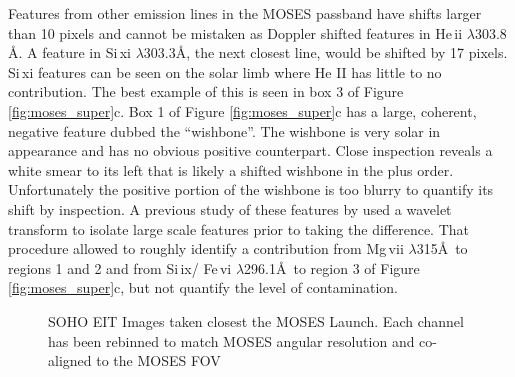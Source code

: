 \documentclass[]{solarphysics}
\begin{document}
\begin{article}
	
	Features from other emission lines in the MOSES passband have shifts larger than 10 pixels and cannot be mistaken as Doppler shifted features in He\,{\sc ii}  $\lambda303.8$ \AA. A feature in Si\,{\sc xi} $\lambda$303.3\AA , the next closest line, would be shifted by 17 pixels. Si\,{\sc xi} features can be seen on the solar limb where He II has little to no contribution. The best example of this is seen in box 3 of Figure \ref{fig:moses_super}c.  Box 1 of Figure \ref{fig:moses_super}c has a large, coherent, negative feature dubbed the ``wishbone''.  The wishbone is very solar in appearance and has no obvious positive counterpart.  Close inspection reveals a white smear to its left that is likely a shifted wishbone in the plus order.  Unfortunately the positive portion of the wishbone is too blurry to quantify its shift by inspection. A previous study of these features by \citet{Rust2017} used a wavelet transform to isolate large scale features prior to taking the difference.  That procedure allowed \citet{Rust2017} to roughly identify a contribution from Mg\,{\sc vii} $\lambda$315\AA \  to regions 1 and 2 and from Si\,{\sc ix}/ Fe\,{\sc vi} $\lambda$296.1\AA \ to region 3 of Figure \ref{fig:moses_super}c, but not quantify the level of contamination.
	\begin{figure}
		
			
		

		
		
		\caption{SOHO EIT Images taken closest the MOSES Launch.  Each channel has been rebinned to match MOSES angular resolution and co-aligned to the MOSES FOV}
		\label{fig:EIT}
	\end{figure}


\end{article}
\end{document}
